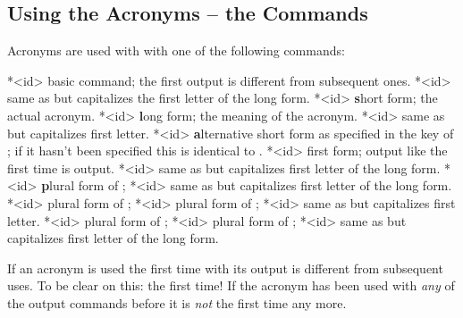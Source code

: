\documentclass[DIV10,toc=index,toc=bib,hyperfootnotes=false]{cnpkgdoc}
\newcommand*\h[1]{\textcolor{main}{\textbf{#1}}}
\begin{document}
\subsection{Using the Acronyms -- the Commands}
Acronyms are used with with one of the following commands:
\begin{beschreibung}
 *{<id>}\newline
   basic command; the first output is different from subsequent ones.
 *{<id>}\newline
   same as  but capitalizes the first letter of the long form.
 *{<id>}\newline
   \h{s}hort form; the actual acronym.
 *{<id>}\newline
   \h{l}ong form; the meaning of the acronym.
 *{<id>}\newline
   same as  but capitalizes first letter.
 *{<id>}\newline
   \h{a}lternative short form as specified in the  key of
   ; if it hasn't been specified this is identical to .
 *{<id>}\newline
   first form; output like the first time  is output.
 *{<id>}\newline
   same as  but capitalizes first letter of the long form.
 *{<id>}\newline
   \h{p}lural form of ;
 *{<id>}\newline
   same as  but capitalizes first letter of the long form.
 *{<id>}\newline
   plural form of ;
 *{<id>}\newline
   plural form of ;
 *{<id>}\newline
   same as  but capitalizes first letter.
 *{<id>}\newline
   plural form of ;
 *{<id>}\newline
   plural form of ;
 *{<id>}\newline
   same as  but capitalizes first letter of the long form.
\end{beschreibung}
If an acronym is used the first time with  its output is different from
subsequent uses. To be clear on this: the first time! If the acronym has been
used with \emph{any} of the output commands before it is \emph{not} the first
time any more.
\end{document}
